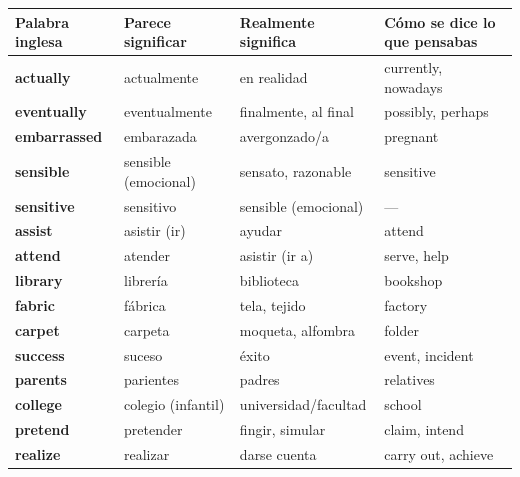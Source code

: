 \documentclass[
  spanish,
  letterpaper,
]{scrbook}
\begin{document}
\begin{longtable}[]{@{}
  >{\raggedright\arraybackslash}p{}
  >{\raggedright\arraybackslash}p{}
  >{\raggedright\arraybackslash}p{}
  >{\raggedright\arraybackslash}p{}@{}}
\toprule\noalign{}
\begin{minipage}[b]{\linewidth}\raggedright
Palabra inglesa
\end{minipage} & \begin{minipage}[b]{\linewidth}\raggedright
Parece significar
\end{minipage} & \begin{minipage}[b]{\linewidth}\raggedright
Realmente significa
\end{minipage} & \begin{minipage}[b]{\linewidth}\raggedright
Cómo se dice lo que pensabas
\end{minipage} \\
\midrule\noalign{}
\endhead
\bottomrule\noalign{}
\endlastfoot
\textbf{actually} & actualmente & en realidad & currently, nowadays \\
\textbf{eventually} & eventualmente & finalmente, al final & possibly,
perhaps \\
\textbf{embarrassed} & embarazada & avergonzado/a & pregnant \\
\textbf{sensible} & sensible (emocional) & sensato, razonable &
sensitive \\
\textbf{sensitive} & sensitivo & sensible (emocional) & --- \\
\textbf{assist} & asistir (ir) & ayudar & attend \\
\textbf{attend} & atender & asistir (ir a) & serve, help \\
\textbf{library} & librería & biblioteca & bookshop \\
\textbf{fabric} & fábrica & tela, tejido & factory \\
\textbf{carpet} & carpeta & moqueta, alfombra & folder \\
\textbf{success} & suceso & éxito & event, incident \\
\textbf{parents} & parientes & padres & relatives \\
\textbf{college} & colegio (infantil) & universidad/facultad & school \\
\textbf{pretend} & pretender & fingir, simular & claim, intend \\
\textbf{realize} & realizar & darse cuenta & carry out, achieve \\

\end{longtable}
\end{document}
